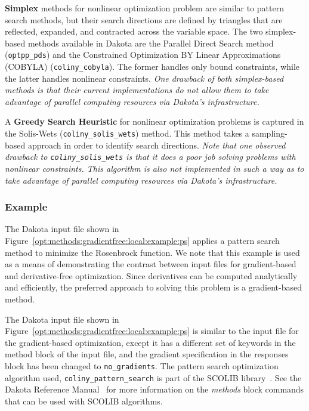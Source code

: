 {\bf Simplex} methods for nonlinear optimization problem are similar
to pattern search methods, but their search directions are defined by
triangles that are reflected, expanded, and contracted across the
variable space.  The two simplex-based methods available in Dakota are
the Parallel Direct Search method~\cite{Den94b} (\texttt{optpp\_pds})
and the Constrained Optimization BY Linear Approximations (COBYLA)
(\texttt{coliny\_cobyla}).  The former handles only bound constraints,
while the latter handles nonlinear constraints.  \emph{One drawback of
  both simplex-based methods is that their current implementations do
  not allow them to take advantage of parallel computing resources via
  Dakota's infrastructure.}

A {\bf Greedy Search Heuristic} for nonlinear optimization problems is
captured in the Solis-Wets (\texttt{coliny\_solis\_wets}) method.
This method takes a sampling-based approach in order to identify
search directions.  \emph{Note that one observed drawback to
  \texttt{coliny\_solis\_wets} is that it does a poor job solving
  problems with nonlinear constraints.  This algorithm is also not
  implemented in such a way as to take advantage of parallel computing
  resources via Dakota's infrastructure.}

\subsubsection{Example}
\label{opt:methods:gradientfree:local:example}

The Dakota input file shown in
Figure~\ref{opt:methods:gradientfree:local:example:ps} applies a
pattern search method to minimize the Rosenbrock function. We note
that this example is used as a means of demonstrating the contrast
between input files for gradient-based and derivative-free
optimization.  Since derivatives can be computed analytically and
efficiently, the preferred approach to solving this problem is a
gradient-based method.

The Dakota input file shown in
Figure~\ref{opt:methods:gradientfree:local:example:ps} is similar to
the input file for the gradient-based optimization, except it has a
different set of keywords in the method block of the input file, and
the gradient specification in the responses block has been changed to
\texttt{no\_gradients}. The pattern search optimization algorithm
used, \texttt{coliny\_pattern\_search} is part of the SCOLIB
library~\cite{Har06}. See the Dakota Reference Manual~\cite{RefMan}
for more information on the \emph{methods} block commands that can be
used with SCOLIB algorithms.

